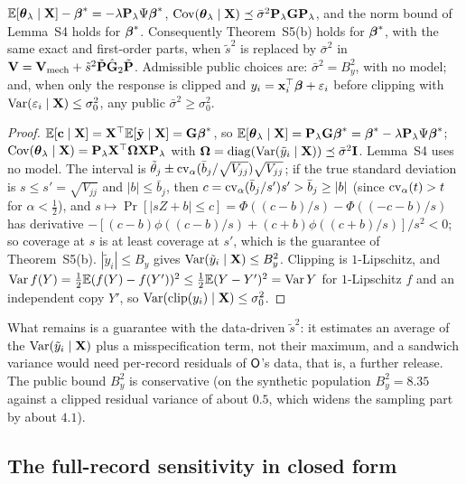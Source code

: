 \begin{proposition}\label{prop:S10b}
$\mathbb{E}[\boldsymbol{\theta}_\lambda\mid\mathbf{X}]-\boldsymbol{\beta}^\ast=-\lambda\mathbf{P}_\lambda\Psi\boldsymbol{\beta}^\ast$, $\operatorname{Cov}(\boldsymbol{\theta}_\lambda\mid\mathbf{X})\preceq\bar\sigma^2\mathbf{P}_\lambda\mathbf{G}\mathbf{P}_\lambda$, and the norm bound of Lemma~S4 holds for $\boldsymbol{\beta}^\ast$. Consequently Theorem~S5(b) holds for $\boldsymbol{\beta}^\ast$, with the same exact and first-order parts, when $\tilde s^2$ is replaced by $\bar\sigma^2$ in $\mathbf{V}=\mathbf{V}_{\mathrm{mech}}+\tilde s^2\tilde{\mathbf{P}}\hat{\mathbf{G}}_2\tilde{\mathbf{P}}$. Admissible public choices are: $\bar\sigma^2=B_y^2$, with no model; and, when only the response is clipped and $y_i=\mathbf{x}_i^\top\boldsymbol{\beta}+\varepsilon_i$ before clipping with $\operatorname{Var}(\varepsilon_i\mid\mathbf{X})\le\sigma_0^2$, any public $\bar\sigma^2\ge\sigma_0^2$.
\end{proposition}
\begin{proof}
$\mathbb{E}[\mathbf{c}\mid\mathbf{X}]=\mathbf{X}^\top\mathbb{E}[\tilde{\mathbf{y}}\mid\mathbf{X}]=\mathbf{G}\boldsymbol{\beta}^\ast$, so $\mathbb{E}[\boldsymbol{\theta}_\lambda\mid\mathbf{X}]=\mathbf{P}_\lambda\mathbf{G}\boldsymbol{\beta}^\ast=\boldsymbol{\beta}^\ast-\lambda\mathbf{P}_\lambda\Psi\boldsymbol{\beta}^\ast$; $\operatorname{Cov}(\boldsymbol{\theta}_\lambda\mid\mathbf{X})=\mathbf{P}_\lambda\mathbf{X}^\top\boldsymbol\Omega\mathbf{X}\mathbf{P}_\lambda$ with $\boldsymbol\Omega=\operatorname{diag}(\operatorname{Var}(\tilde y_i\mid\mathbf{X}))\preceq\bar\sigma^2\mathbf{I}$. Lemma~S4 uses no model. The interval is $\tilde\theta_j\pm\operatorname{cv}_\alpha(\bar b_j/\sqrt{V_{jj}})\sqrt{V_{jj}}$; if the true standard deviation is $s\le s'=\sqrt{V_{jj}}$ and $|b|\le\bar b_j$, then $c=\operatorname{cv}_\alpha(\bar b_j/s')s'>\bar b_j\ge|b|$ (since $\operatorname{cv}_\alpha(t)>t$ for $\alpha<\tfrac12$), and $s\mapsto\Pr[|sZ+b|\le c]=\Phi((c-b)/s)-\Phi((-c-b)/s)$ has derivative $-[(c-b)\phi((c-b)/s)+(c+b)\phi((c+b)/s)]/s^2<0$; so coverage at $s$ is at least coverage at $s'$, which is the guarantee of Theorem~S5(b). $|\tilde y_i|\le B_y$ gives $\operatorname{Var}(\tilde y_i\mid\mathbf{X})\le B_y^2$. Clipping is $1$-Lipschitz, and $\operatorname{Var} f(Y)=\tfrac12\mathbb{E}(f(Y)-f(Y'))^2\le\tfrac12\mathbb{E}(Y-Y')^2=\operatorname{Var} Y$ for $1$-Lipschitz $f$ and an independent copy $Y'$, so $\operatorname{Var}(\operatorname{clip}(y_i)\mid\mathbf{X})\le\sigma_0^2$.
\end{proof}
What remains  is a guarantee with the data-driven $\tilde s^2$: it estimates an average of the $\operatorname{Var}(\tilde y_i\mid\mathbf{X})$ plus a misspecification term, not their maximum, and a sandwich variance would need per-record residuals of $\mathsf{O}$'s data, that is, a further release. The public bound $B_y^2$ is conservative (on the synthetic population $B_y^2=8.35$ against a clipped residual variance of about $0.5$, which widens the sampling part by about $4.1$).

\subsection{The full-record sensitivity in closed form}

